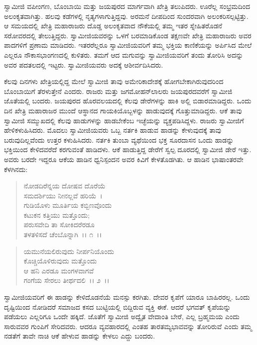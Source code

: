  ಸ್ವಾಮೀಜಿ ವಪೀಂಗಣ, ಬೊಂಬಾಯಿ ಮತ್ತು ಜಯಪುರದ ಮಾರ್ಗವಾಗಿ ಖೇತ್ರಿ ತಲುಪಿದರು. ಊರೆಲ್ಲ ಸಂಭ್ರಮದಿಂದ ಅಲಂಕೃತವಾಗಿತ್ತು. ಹಲವು ಕಡೆಗಳಲ್ಲಿ ನೃತ್ಯಗಳಾಗುತ್ತಿದ್ದವು. ಅರಮನೆ ದೀಪದಿಂದ ಸುಂದರವಾಗಿ ಅಲಂಕರಿಸಲ್ಪಟ್ಟಿತ್ತು. ಆ ಸಮಯದಲ್ಲಿ ಖೇತ್ರಿ ಮಹಾರಾಜರು ದೊಡ್ಡ ಅಲಂಕೃತವಾದ ನೌಕೆಯಲ್ಲಿ ತಮ್ಮ ಇತರ ಸ್ನೇಹಿತರೊಡನೆ ಸರೋವರದಲ್ಲಿ ತೇಲುತ್ತಿದ್ದರು. ಸ್ವಾಮೀಜಿಯವರನ್ನು ಒಳಗೆ ಬರಮಾಡಿಕೊಂಡ ತಕ್ಷಣವೇ ಖೇತ್ರಿ ಮಹಾರಾಜರು ಅವರ ಪಾದಗಳಿಗೆ ಪ್ರಣಾಮ ಮಾಡಿದರು. ಇತರರೆಲ್ಲರೂ ಸ್ವಾಮೀಜಿಯವರಿಗೆ ತಮ್ಮ ಭಕ್ತಿಯ ಕಾಣಿಕೆಯನ್ನು ಅರ್ಪಿಸಿದ ಮೇಲೆ ಎಲ್ಲರೂ ನೌಕಾಸಭಾಂಗಣದಲ್ಲಿ ಕುಳಿತರು. ತಮಗೆ ಆದ ಮಗುವನ್ನು ಸ್ವಾಮೀಜಿಯವರಿಗೆ ತಂದು ತೋರಿಸಿ ಅದನ್ನು ಅವರ ಪದತಲದಲ್ಲಿ ಇಟ್ಟರು. ಸ್ವಾಮೀಜಿಯವರು ಅದಕ್ಕೆ ಆಶೀರ್ವದಿಸಿದರು. 

 ಕೆಲವು ದಿನಗಳು ಖೇತ್ರಿಯಲ್ಲಿದ್ದ ಮೇಲೆ ಸ್ವಾಮೀಜಿ ತಾವು ಅಮೇರಿಕಾದೇಶಕ್ಕೆ ಹೋಗಬೇಕಾಗಿರುವುದರಿಂದ ಬೊಂಬಾಯಿಗೆ ತೆರಳುತ್ತೇನೆ ಎಂದರು. ರಾಜರು ಮತ್ತು ಜಗಮೋಹನ್‍ಲಾಲರು ಜಯಪುರದವರೆಗೆ ಸ್ವಾಮೀಜಿ ಜೊತೆಯಲ್ಲಿ ಬಂದರು. ಜಯಪುರದ ಹೊರವಲಯದಲ್ಲಿ ಕೆಲವು ಡೇರೆಗಳನ್ನು ಹಾಕಿ ಅಲ್ಲಿ ಬಿಡಾರಮಾಡಿದ್ದರು. ಒಂದು ದಿನ ಖೇತ್ರಿ ಮಹಾರಾಜರ ಮುಂದೆ ಆಸ್ಥಾನದ ಗಾಯಕಿಯೊಬ್ಬಳನ್ನು ಹಾಡುವುದಕ್ಕೆ ಗೊತ್ತುಮಾಡಿದ್ದರು. ಆಕೆ ತಾವು ಸ್ವಾಮೀಜಿ ಸಮ್ಮುಖದಲ್ಲಿ ಕೆಲವು ಹಾಡುಗಳನ್ನು ಹಾಡಬೇಕೆಂಬ ಇಚ್ಛೆಯನ್ನು ವ್ಯಕ್ತಪಡಿಸಿದ್ದಳು. ರಾಜರು ಸ್ವಾಮೀಜಿಗೆ ಹೇಳಿಕಳುಹಿಸಿದರು. ಮೊದಲು ಸ್ವಾಮೀಜಿಯವರು ಒಬ್ಬ ನರ್ತಕಿ ಹಾಡುವ ಹಾಡನ್ನು ಕೇಳುವುದಕ್ಕೆ ತಾವು ಬರುವುದಿಲ್ಲವೆಂದು ಉತ್ತರ ಕಳುಹಿಸಿದರು. ನರ್ತಕಿ ತುಂಬಾ ವ್ಯಥೆಯಿಂದ ಭಕ್ತ ಸೂರದಾಸನ ಒಂದು ಹಾಡನ್ನು ಭಕ್ತಿಯಿಂದ ಕೇಳಿದವರೆದೆ ಕರಗುವಂತೆ ಹಾಡಿದಳು. ಆಕೆ ಹಾಡುತ್ತಿದ್ದ ಡೇರೆಗೆ ಸ್ವಲ್ಪ ದೂರದಲ್ಲಿ ಸ್ವಾಮೀಜಿ ಡೇರೆ ಇತ್ತು. ಅವರು ಬರದೇ ಇದ್ದರೂ ಆಕೆಯ ಹಾಡಿನ ಧ್ವನಿಸ್ಪಂದನ ಅವರ ಕಿವಿಗೆ ಕೇಳತೊಡಗಿತು. ಆ ಹಾಡಿನ ಭಾಷಾಂತರವೇ ಕೆಳಗಿನದು:

\begin{verse}
ನೋಡದಿರೆನ್ನಯ ದೋಷವ ದೊರೆಯೆ\\ಸಮದರ್ಶಿಯು ನೀನಲ್ಲವೆ ಹರಿಯೆ~। \\ಗುಡಿಯೊಳು ಮೂರ್ತಿಯ ಕಬ್ಬಿಣವೊಂದು \\ಕಟುಕನ ಕತ್ತಿಯು ಮತ್ತೊಂದು;\\ಪರುಸವೇದಿ ತಾ ಸೋಕಿದರೆರಡೂ \\ತಳತಳಿಸದೆ ಚೆಂಬೊನ್ನಾಗಿ~।। ೧~।।
\end{verse}

\begin{verse}
ಯಮುನೆಯಲಿರುವುದು ನೀರ್ಪನಿಯೊಂದು \\ಕೊಚ್ಚಿಯೊಳಿರುವುದು ಮತ್ತೊಂದು\\ಆ ಹನಿ ಎರಡೂ ಮಂಗಳವಾಗವೆ\\ಗಂಗೆಯ ಸೇರಲು ತೀರ್ಥದಲಿ~।। ೨~।। 
\end{verse}

 ಸ್ವಾಮೀಜಿಯವರಿಗೆ ಈ ಹಾಡನ್ನು ಕೇಳಿದೊಡನೆಯೆ ಮನಸ್ಸು ಕರಗಿತು. ದೇವರ ಕೃಪೆಗೆ ಯಾರೂ ಬಾಹಿರರಲ್ಲ. ಒಂದು ದೃಷ್ಟಿಯಿಂದ ನೋಡಿದರೆ ಸಮಾಜದ ಕಸದ ಬುಟ್ಟಿಯಲ್ಲಿ ಬಿದ್ದಿರುವ ವ್ಯಕ್ತಿ ಈಕೆ. ಆದರೆ ಭಗವತ್ ಕೃಪೆಯನ್ನು ಪಡೆಯಲು ಎಲ್ಲರಿಗೂ ಒಂದೇ ಹಕ್ಕಿದೆ. ಜೊತೆಗೆ ಸ್ವಾಮೀಜಿ ಅದ್ವೈತ ವೇದಾಂತಿ ಬೇರೆ, ಎಲ್ಲ ಬ್ರಹ್ಮಮಯ ಎಂದು ಸಾರುವವರ ಗುಂಪಿಗೆ ಸೇರಿದವರು. ಆದರೂ ವ್ಯವಹಾರದಲ್ಲಿ ಎಂತಹ ತಾರತಮ್ಯಭಾವವನ್ನು ತೋರಿರುವೆ ಎಂದು ತಮ್ಮ ನಡತೆಗೆ ತಾವೇ ನಾಚಿ ಆಕೆ ಹೇಳುವ ಹಾಡನ್ನು ಕೇಳಲು ಎದ್ದು ಬಂದರು. 

